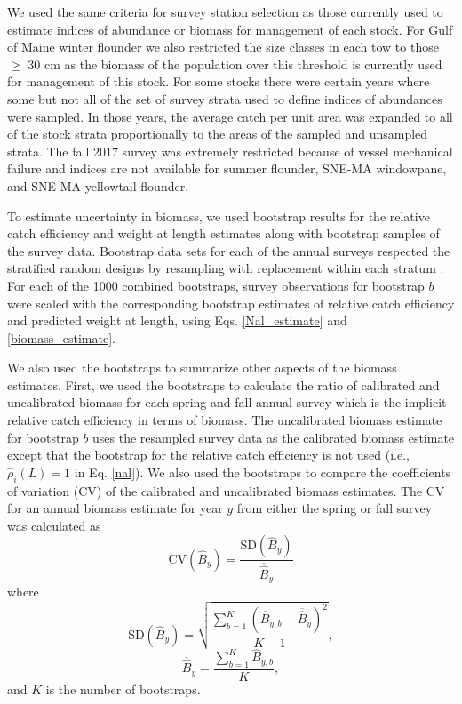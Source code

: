\documentclass[
  12pt,
]{article}
\begin{document}
We used the same criteria for survey station selection as those
currently used to estimate indices of abundance or biomass for
management of each stock. For Gulf of Maine winter flounder we also
restricted the size classes in each tow to those \(\geq\) 30 cm as the
biomass of the population over this threshold is currently used for
management of this stock. For some stocks there were certain years where
some but not all of the set of survey strata used to define indices of
abundances were sampled. In those years, the average catch per unit area
was expanded to all of the stock strata proportionally to the areas of
the sampled and unsampled strata. The fall 2017 survey was extremely
restricted because of vessel mechanical failure and indices are not
available for summer flounder, SNE-MA windowpane, and SNE-MA yellowtail
flounder.

To estimate uncertainty in biomass, we used bootstrap results for the
relative catch efficiency and weight at length estimates along with
bootstrap samples of the survey data. Bootstrap data sets for each of
the annual surveys respected the stratified random designs by resampling
with replacement within each stratum \citep{smith97}. For each of the
1000 combined bootstraps, survey observations for bootstrap \(b\) were
scaled with the corresponding bootstrap estimates of relative catch
efficiency and predicted weight at length, using Eqs. \ref{Nal_estimate}
and \ref{biomass_estimate}.

We also used the bootstraps to summarize other aspects of the biomass
estimates. First, we used the bootstraps to calculate the ratio of
calibrated and uncalibrated biomass for each spring and fall annual
survey which is the implicit relative catch efficiency in terms of
biomass. The uncalibrated biomass estimate for bootstrap \(b\) uses the
resampled survey data as the calibrated biomass estimate except that the
bootstrap for the relative catch efficiency is not used (i.e.,
\(\widehat \rho_i\left(L\right) = 1\) in Eq. \ref{nal}). We also used
the bootstraps to compare the coefficients of variation (CV) of the
calibrated and uncalibrated biomass estimates. The CV for an annual
biomass estimate for year \(y\) from either the spring or fall survey
was calculated as \[
\text{CV}\left(\widehat B_y\right) = \frac{\text{SD}\left(\widehat B_y\right)}{\overline{\widehat B}_y}
\] where \[
\text{SD}\left(\widehat B_y\right) = \sqrt{\frac{\sum_{b=1}^K \left(\widehat B_{y,b} - \overline{\widehat B}_y\right)^2}{K-1}},
\] \[
\overline{\widehat B}_y = \frac{\sum_{b=1}^K \widehat B_{y,b}}{K},
\] and \(K\) is the number of bootstraps.
\end{document}
